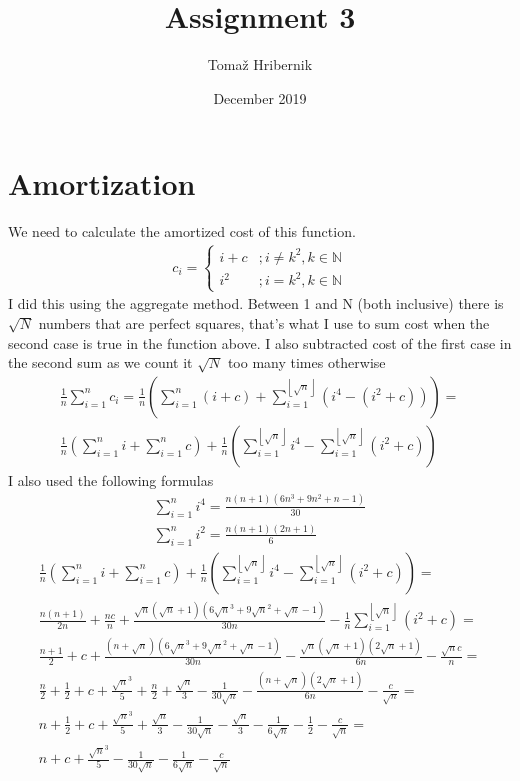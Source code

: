 \documentclass[12pt]{article}
\title{Assignment 3}
\author{Tomaž Hribernik}
\date{December 2019}
\begin{document}
\maketitle

\section{Amortization}
	We need to calculate the amortized cost of this function.
	\begin{gather*}
	c_i =
	\begin{cases}
	i + c & ;i \neq k^{2}, k \in \mathbb N \\
	i^{2} & ;i = k^{2}, k \in \mathbb N
	\end{cases}
	\end{gather*}
	I did this using the aggregate method. Between 1 and N (both inclusive) there is $\sqrt{N}$ numbers that are perfect squares, that's what I use to sum cost when the second case is true in the function above. I also subtracted cost of the first case in the second sum as we count it $\sqrt{N}$ too many times otherwise
	\begin{gather*}
	\frac{1}{n}\sum_{i=1}^{n}{c_i} = \frac{1}{n}(\sum_{i=1}^{n}{(i + c)} + \sum_{i=1}^{\left \lfloor{\sqrt{n}}\right \rfloor}{(i^{4}-(i^2 + c))}) = \\
	\frac{1}{n}(\sum_{i=1}^{n}{i} + \sum_{i=1}^{n}{c}) + \frac{1}{n}(\sum_{i=1}^{\left \lfloor{\sqrt{n}}\right \rfloor}{i^{4}} - \sum_{i=1}^{\left \lfloor{\sqrt{n}}\right \rfloor}{(i^2 + c)})
	\end{gather*}
	I also used the following formulas
	\begin{gather*}
	\sum_{i=1}^{n}{i^{4}} = \frac{n(n+1)(6n^3 + 9n^2 + n - 1)}{30}\\	
	\sum_{i=1}^{n}{i^{2}} = \frac{n(n+1)(2n+1)}{6}
	\end{gather*}
	\begin{gather*}
	\frac{1}{n}(\sum_{i=1}^{n}{i} + \sum_{i=1}^{n}{c}) + \frac{1}{n}(\sum_{i=1}^{\left \lfloor{\sqrt{n}}\right \rfloor}{i^{4}} - \sum_{i=1}^{\left \lfloor{\sqrt{n}}\right \rfloor}{(i^2 + c)}) =\\
	\frac{n(n+1)}{2n} + \frac{nc}{n} + \frac{\sqrt{n}(\sqrt{n} + 1)(6\sqrt{n}^{3} + 9\sqrt{n}^{2} + \sqrt{n} - 1)}{30n} - \frac{1}{n}\sum_{i=1}^{\left \lfloor{\sqrt{n}}\right \rfloor}{(i^2 + c)} = \\
	\frac{n+1}{2} + c + \frac{(n + \sqrt{n})(6\sqrt{n}^{3} + 9\sqrt{n}^{2} + \sqrt{n} - 1)}{30n} - \frac{\sqrt{n}(\sqrt{n} + 1)(2\sqrt{n} + 1)}{6n} - \frac{\sqrt{n}c}{n} =\\
	\frac{n}{2} + \frac{1}{2} + c + \frac{\sqrt{n}^{3}}{5} + \frac{n}{2} + \frac{\sqrt{n}}{3} - \frac{1}{30\sqrt{n}} - \frac{(n + \sqrt{n})(2\sqrt{n} + 1)}{6n} - \frac{c}{\sqrt{n}} =\\
	n + \frac{1}{2} + c + \frac{\sqrt{n}^{3}}{5} + \frac{\sqrt{n}}{3} - \frac{1}{30\sqrt{n}} - \frac{\sqrt{n}}{3} - \frac{1}{6\sqrt{n}} - \frac{1}{2} - \frac{c}{\sqrt{n}} =\\
	n + c + \frac{\sqrt{n}^{3}}{5} - \frac{1}{30\sqrt{n}} - \frac{1}{6\sqrt{n}} - \frac{c}{\sqrt{n}}
	\end{gather*}
\end{document}
